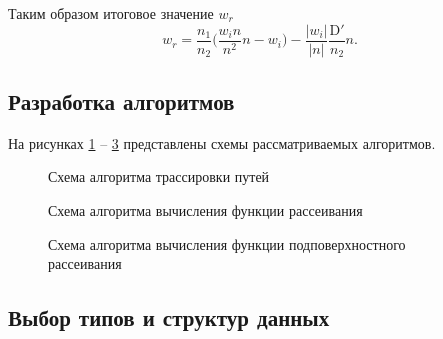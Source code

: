 Таким образом итоговое значение $w_r$
\begin{equation}
    w_r = \frac{n_1}{n_2}\Big( \frac{w_i n}{n^2}n - w_i\Big) - \frac{|w_i|}{|n|} \frac{\mathrm{D'}}{n_2} n.
\end{equation}

\subsection{Разработка алгоритмов}
На рисунках \ref{fig:algorithm_rt} -- \ref{fig:algorithm_bssrdf} представлены
схемы рассматриваемых алгоритмов.

\clearpage
\vspace*{\fill}
\begin{figure}[h]
    \centering
    \def\svgwidth{0.95\textwidth}
    
    \caption{Схема алгоритма трассировки путей}
    \label{fig:algorithm_rt}
\end{figure}
\vfill
\clearpage

\clearpage
\vspace*{\fill}
\begin{figure}[h]
    \centering
    \def\svgwidth{0.6\textwidth}
    
    \caption{Схема алгоритма вычисления функции рассеивания}
    \label{fig:algorithm_bsdf}
\end{figure}
\vfill
\clearpage

\clearpage
\vspace*{\fill}
\begin{figure}[h]
    \centering
    \def\svgwidth{0.2\textwidth}
    
    \caption{Схема алгоритма вычисления функции подповерхностного рассеивания}
    \label{fig:algorithm_bssrdf}
\end{figure}
\vfill
\clearpage

\subsection{Выбор типов и структур данных}

